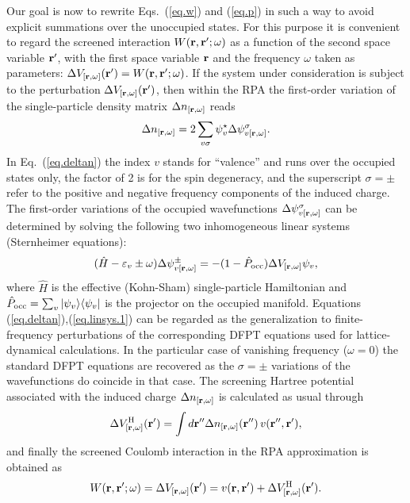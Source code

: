\documentclass[twocolumn,prb,showpacs,superscriptaddress]{revtex4}
\def\w{\omega}
\def\H{\hat{H}}
\def\P{\hat{P}_{\rm occ}}
\def\E{\varepsilon}
\def\s{\sigma}
\def\r{{\bf r}}
\def\rp{{\bf r^\prime}}
\def\rpp{{\bf r^{\prime\prime}}}
\begin{document}
Our goal is now to rewrite Eqs.\ (\ref{eq.w}) and (\ref{eq.p})
in such a way to avoid explicit summations over the unoccupied states.
For this purpose it is convenient to regard the screened interaction
$W(\r,\rp;\w)$ as a function of the 
second space variable $\rp$, with the first space variable 
$\r$ and the frequency $\w$ taken as parameters: $\Delta V_{[\r,\w]}(\rp) = W(\r,\rp;\w)$.
If the system under consideration is subject to the perturbation
$\Delta V_{[\r,\w]}(\rp)$, then within the RPA the first-order variation 
of the single-particle density matrix $\Delta n_{[\r,\w]}$ reads
  \begin{equation}\label{eq.deltan}
  \Delta n_{[\r,\w]} = 2\sum_{v\s} \psi_v^\star  \Delta \psi^\s_{v[\r,\w]}.
  \end{equation}
In Eq.\ (\ref{eq.deltan}) the index $v$ stands for ``valence'' and runs
over the occupied states only, the factor of 2 is for the spin degeneracy, 
and the superscript $\sigma=\pm$ refer to the positive and negative
frequency components of the induced charge.
The first-order variations of the occupied wavefunctions $\Delta \psi^\s_{v[\r,\w]}$
can be determined by solving the following two inhomogeneous linear systems (Sternheimer equations):
  \begin{equation}\label{eq.linsys.1}
  (\H-\E_v\pm\w) \Delta \psi^\pm_{v[\r,\w]}  = -(1-\P)  \Delta V_{[\r,\w]} \psi_v, 
  \end{equation}
where $\H$ is the effective (Kohn-Sham) single-particle Hamiltonian and 
$\P=\sum_v |\psi_v\rangle\langle\psi_v|$ is the projector
on the occupied manifold. 
Equations (\ref{eq.deltan}),(\ref{eq.linsys.1}) can be regarded as 
the generalization to finite-frequency perturbations of the corresponding DFPT equations
used for lattice-dynamical calculations.\cite{baroni.rmp} 
In the particular case of vanishing frequency ($\w=0$)
the standard DFPT equations are recovered as the $\sigma=\pm$ variations
of the wavefunctions do coincide in that case.
The screening Hartree potential associated with the induced charge 
$\Delta n_{[\r,\w]}$ is calculated as usual through
  \begin{equation}
  \Delta V^{\rm H}_{[\r,\w]}(\rp) = \int d\rpp \Delta n_{[\r,\w]} (\rpp) \, v(\rpp,\rp),
  \end{equation}
and finally the screened Coulomb interaction in the RPA approximation is obtained as 
  \begin{equation}\label{eq.w.dfpt}
  W(\r,\rp;\w) = \Delta V_{[\r,\w]}(\rp) = v(\r,\rp) + \Delta V^{\rm H}_{[\r,\w]}(\rp).
  \end{equation}
\end{document}
